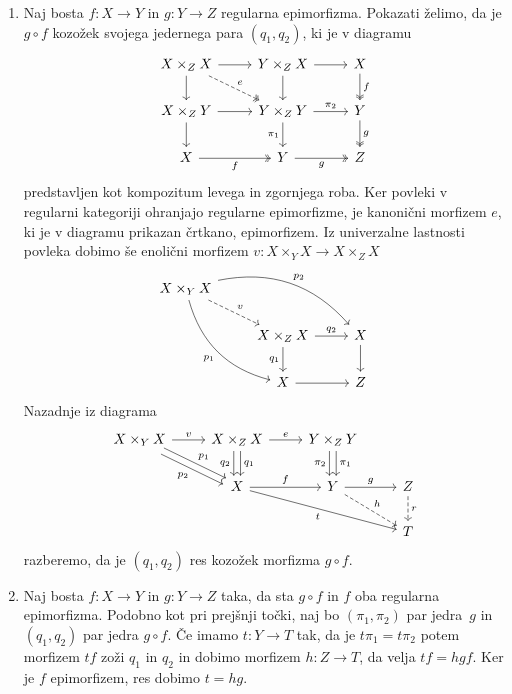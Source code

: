 \documentclass[../kategoricna_logika.tex]{subfiles}
\begin{document}
\begin{dokaz}
\begin{enumerate}[label=(\roman*)]
  \item %
    Naj bosta $f : X \to Y$ in $g : Y \to Z$ regularna epimorfizma.
    Pokazati želimo, da je $g \circ f$ kozožek svojega jedernega para
    $(q_1, q_2)$, ki je v diagramu
    \begin{equation*}
      \begin{tikzcd}[column sep=normal]
        X \times_Z X \ar[d] \ar[r] \ar[dr, dashed, two heads, "e"]  & Y \times_Z X \ar[d ] \ar[r] & X \ar[d, two heads, "f"] \\
        X \times_Z Y \ar[d] \ar[r] & Y \times_Z Y \ar[d, "\pi_1"'] \ar[r, "\pi_2"] & Y \ar[d, two heads, "g"] \\
        X \ar[r, two heads, "f"'] & Y \ar[r, two heads, "g"'] & Z
      \end{tikzcd}
    \end{equation*}
    predstavljen kot kompozitum levega in zgornjega roba.  Ker povleki
    v regularni kategoriji ohranjajo regularne epimorfizme, je
    kanonični morfizem $e$, ki je v diagramu prikazan črtkano,
    epimorfizem.  Iz univerzalne lastnosti povleka dobimo še enolični
    morfizem $v : X \times_Y X \to X \times_Z X$
    \begin{equation*}
      \begin{tikzcd}[column sep=normal, row sep=normal]
        X \times_Y X \ar[ddr, bend right, "p_1"'] \ar[drr, bend left, "p_2"] \ar[dr, dashed, "v"] & & \\
        & X \times_Z X \ar[d, "q_1"'] \ar[r, "q_2"] & X \ar[d] \\
        & X \ar[r] & Z
      \end{tikzcd}
    \end{equation*}
    Nazadnje iz diagrama
    \begin{equation*}
      \begin{tikzcd}
        X \times_Y X \ar[dr, shift left, "p_1"] \ar[dr, shift right, "p_2"'] \ar[r, "v"] &
        X \times_Z X \ar[d, shift left, "q_1"] \ar[d, shift right, "q_2"'] \ar[r, "e"] &
        Y \times_Z Y \ar[d, shift left, "\pi_1"] \ar[d, shift right, "\pi_2"'] &  \\
        & X \ar[r, "f"] \ar[drr, "t"'] & Y \ar[r, "g"] \ar[dr, dashed, "h"] & Z \ar[d, dashed, "r"] \\
        & & & T
      \end{tikzcd}
    \end{equation*}
    razberemo, da je $(q_1, q_2)$ res kozožek morfizma $g \circ f$.

  \item %
    Naj bosta $f : X \to Y$ in $g : Y \to Z$ taka, da sta $g \circ f$
    in $f$ oba regularna epimorfizma.  Podobno kot pri prejšnji točki,
    naj bo $(\pi_1, \pi_2)$ par jedra~$g$ in $(q_1, q_2)$ par jedra
    $g \circ f$.  Če imamo $t : Y \to T$ tak, da je
    $t \pi_1 = t \pi_2$ potem morfizem $tf$ zoži $q_1$ in $q_2$ in
    dobimo morfizem $h : Z \to T$, da velja $t f = h g f$. Ker je $f$
    epimorfizem, res dobimo $t = h g$.
  \end{enumerate}
\end{dokaz}
\end{document}
